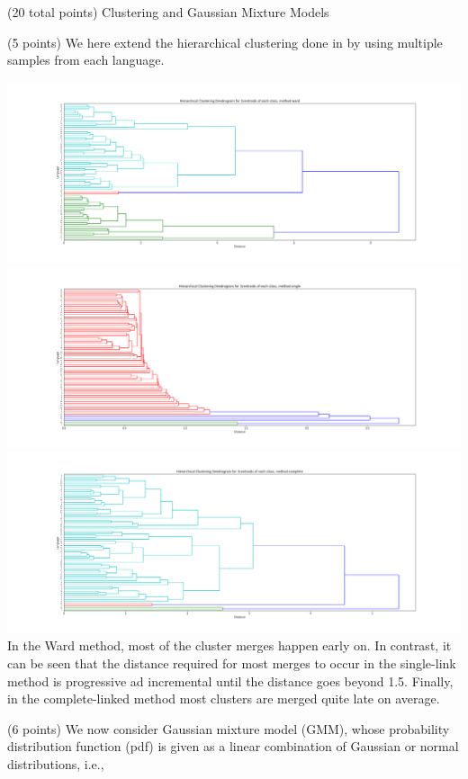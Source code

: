 \documentclass[12pt]{article}
\begin{document}
\begin{question}{(20 total points) Clustering and Gaussian Mixture Models}
\begin{subquestion}{(5 points)
       We here extend the hierarchical clustering done in  by
       using multiple samples from each language.
     }
      \begin{answerbox}{50em}
         \includegraphics[width = 1.0\textwidth]{q3_4_ward.png}
         \includegraphics[width = 1.0\textwidth]{q3_4_single.png}
         \includegraphics[width = 1.0\textwidth]{q3_4_complete.png}
         In the Ward method, most of the cluster merges happen early on. In contrast, it can be seen that the distance required for most merges to occur in the single-link method is progressive ad incremental until the distance goes beyond 1.5. Finally, in the complete-linked method most clusters are merged quite late on average.
         
         
      \end{answerbox}
  


   \end{subquestion}
   \begin{subquestion}{(6 points)
       We now consider Gaussian mixture model (GMM), whose
       probability distribution function (pdf) is given as
       a linear combination of Gaussian or normal distributions, i.e.,
     } \label{Q3.5}





\end{subquestion}
\end{question}
\end{document}
